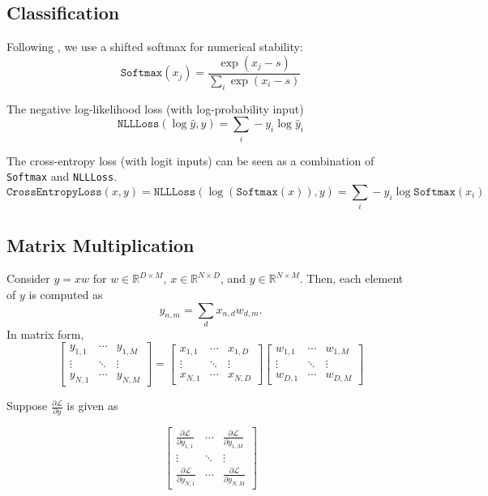 \documentclass{lucas-report}
\begin{document}
\subsection{Classification}

Following \cite{accurate-softmax}, we use a shifted softmax for numerical stability:
\[
  \texttt{Softmax}(x_j) = \frac{\exp{(x_j - s)}}{\sum_i{\exp{(x_i - s)}}}
\]

The negative log-likelihood loss (with log-probability input)
\[
  \texttt{NLLLoss}(\log\hat{y}, y) = \sum_i -y_i \log \hat{y}_i
\]

The cross-entropy loss (with logit inputs) can be seen as a combination of \texttt{Softmax} and \texttt{NLLLoss}.
\[
  \texttt{CrossEntropyLoss}(x, y) = \texttt{NLLLoss}(\log (\texttt{Softmax}(x)), y) = \sum_i -y_i \log \texttt{Softmax}(x_i)
\]


\subsection{Matrix Multiplication}

Consider \(y=xw\) for \(w \in \mathbb{R}^{D \times M}\), \(x \in \mathbb{R}^{N \times D}\), and \(y \in \mathbb{R}^{N \times M}\).
Then, each element of \(y\) is computed as
\[
  y_{n,m} = \sum_d x_{n,d} w_{d,m}.
\]
In matrix form,
\[
  \begin{bmatrix}
    y_{1,1} & \cdots & y_{1,M} \\
    \vdots  & \ddots  & \vdots \\
    y_{N,1} & \cdots & y_{N,M}
  \end{bmatrix} 
    = 
  \begin{bmatrix}
    x_{1,1} & \cdots & x_{1,D} \\
    \vdots  & \ddots  & \vdots \\
    x_{N,1} & \cdots & x_{N,D}
  \end{bmatrix}
  \begin{bmatrix}
    w_{1,1} & \cdots & w_{1,M} \\
    \vdots  & \ddots  & \vdots \\
    w_{D,1} & \cdots & w_{D,M}
  \end{bmatrix}
\]

Suppose \(\frac{\partial \mathcal{L} }{\partial y}\) is given as

\[
  \begin{bmatrix}
    \frac{\partial \mathcal{L} }{\partial y_{1,1}} & \cdots & \frac{\partial \mathcal{L} }{\partial y_{1,M}} \\
    \vdots  & \ddots  & \vdots \\
    \frac{\partial \mathcal{L} }{\partial y_{N,1}} & \cdots & \frac{\partial \mathcal{L} }{\partial y_{N,M}}
  \end{bmatrix}
\]
\end{document}
